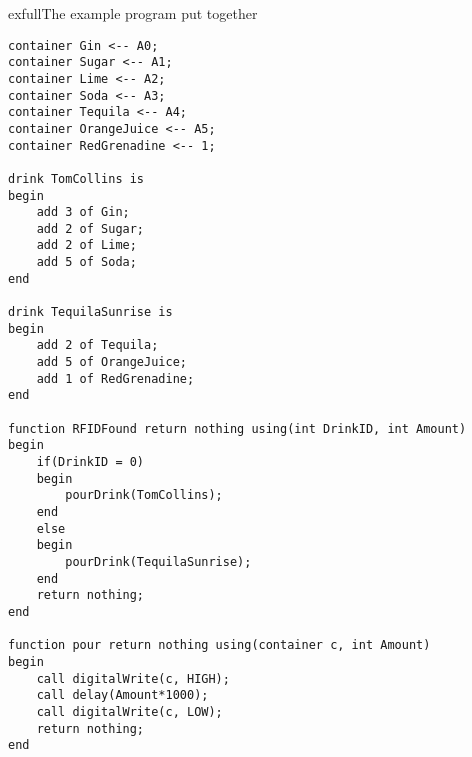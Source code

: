 \begin{code}{exfull}{The example program put together}
\begin{lstlisting}
container Gin <-- A0;
container Sugar <-- A1;
container Lime <-- A2;
container Soda <-- A3;
container Tequila <-- A4;
container OrangeJuice <-- A5;
container RedGrenadine <-- 1;

drink TomCollins is
begin
	add 3 of Gin;
	add 2 of Sugar;
	add 2 of Lime;
	add 5 of Soda;
end

drink TequilaSunrise is 
begin
	add 2 of Tequila;
	add 5 of OrangeJuice;
	add 1 of RedGrenadine;
end

function RFIDFound return nothing using(int DrinkID, int Amount)
begin
	if(DrinkID = 0)
	begin
		pourDrink(TomCollins);
	end
	else
	begin
		pourDrink(TequilaSunrise);
	end
	return nothing;
end

function pour return nothing using(container c, int Amount)
begin
	call digitalWrite(c, HIGH);
	call delay(Amount*1000);
	call digitalWrite(c, LOW);
	return nothing;
end
\end{lstlisting}
\end{code}